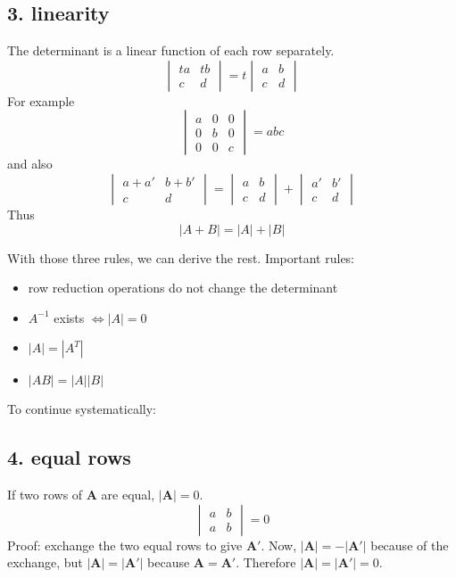 \documentclass[11pt, oneside]{article}
\begin{document}
\subsection*{3. linearity}
The determinant is a linear function of each row separately.
\[
\begin{vmatrix} ta & tb \\ c & d  \end{vmatrix}
= t
\begin{vmatrix} a & b \\ c & d  \end{vmatrix}
\]
For example 
\[
\begin{vmatrix} a  & 0 & 0 \\ 0  & b & 0 \\ 0 & 0 & c \end{vmatrix}
= abc
\]
and also
\[
\begin{vmatrix} a+a'  &  b+b' \\ c  &  d \end{vmatrix}
=
\begin{vmatrix} a  &  b \\ c  &  d \end{vmatrix}
+
\begin{vmatrix} a'  &  b' \\ c  &  d \end{vmatrix}
\]
Thus
\[ |A+B| = |A| + |B| \]

With those three rules, we can derive the rest.  Important rules:

\begin{itemize}
 \item row reduction operations do not change the determinant
 \item $A^{-1}$ exists $\iff |A| = 0$
 \item $|A| = |A^T|$
 \item $|AB| = |A| |B|$
 
\end{itemize}

To continue systematically:
\subsection*{4. equal rows}
If two rows of $\mathbf{A}$ are equal, $|\mathbf{A}| =0$.
\[
\begin{vmatrix} a & b \\ a & b \end{vmatrix}
= 0
\]
Proof:  exchange the two equal rows to give $\mathbf{A'}$.  Now, $|\mathbf{A}| = -|\mathbf{A'}|$ because of the exchange, but $|\mathbf{A}| = |\mathbf{A'}|$ because $\mathbf{A}=\mathbf{A'}$.  Therefore $|\mathbf{A}| = |\mathbf{A'}| = 0$.
\end{document}
